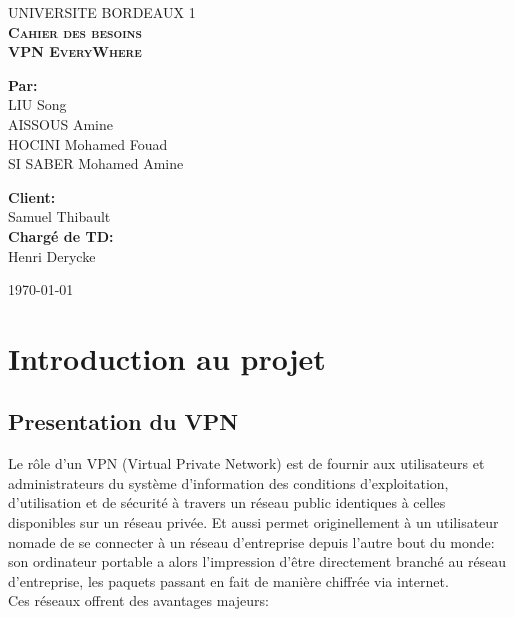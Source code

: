 \documentclass[12pt,a4paper]{article}
\begin{document}
\begin{titlepage}
\begin{center}

\textsc{\LARGE UNIVERSITE BORDEAUX 1 }\\[1.5cm]
\textsc{\huge \bfseries Cahier des besoins }\\[1.5cm]
\textsc{\huge \bfseries VPN EveryWhere }\\[1.5cm]




\Large \begin{flushleft}\textbf{Par: }\\
LIU Song\\
AISSOUS Amine\\
HOCINI Mohamed Fouad\\
SI SABER Mohamed Amine\\
\end{flushleft}

\Large 
\begin{flushright}\textbf{Client: }\\
Samuel Thibault\\

\textbf{Chargé de TD: }\\
Henri Derycke\\
\end{flushright}


\vfill
{\large \today}
\end{center}
\end{titlepage}
\tableofcontents 
\newpage



\section{Introduction au projet}
\subsection{Presentation du VPN}

Le rôle d'un VPN (Virtual Private Network) est de fournir aux utilisateurs et administrateurs du système d'information des conditions d'exploitation, d'utilisation et de sécurité à travers un réseau public identiques à celles disponibles sur un réseau privée. Et aussi permet originellement à un utilisateur nomade de se connecter à un réseau d'entreprise depuis l'autre bout du monde: son ordinateur portable a alors l'impression d'être directement branché au réseau d'entreprise, les paquets passant en fait de manière chiffrée via internet.\\
Ces réseaux offrent des avantages majeurs: \\
\end{document}
